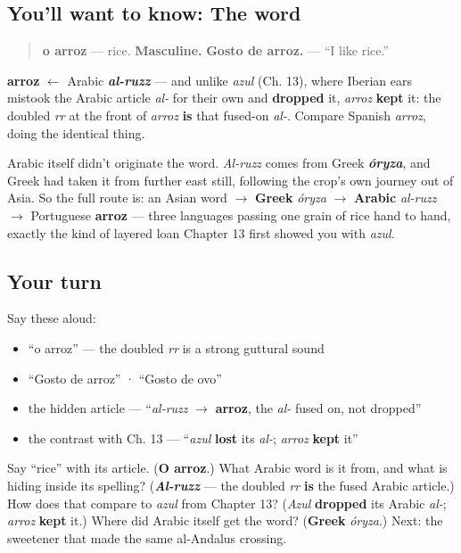 \subsection*{You'll want to know: The word}
\begin{quote}
\textbf{o arroz} — rice. \textbf{Masculine.} \textbf{Gosto de arroz.} — \textquotedblleft{}I like rice.\textquotedblright{}
\end{quote}

\begin{cousinweb}
\textbf{arroz} $\leftarrow$ Arabic \emph{\textbf{al-ruzz}} — and unlike \emph{azul} (Ch. 13), where Iberian ears mistook the Arabic article \emph{al-} for their own and \textbf{dropped} it, \emph{arroz} \textbf{kept} it: the doubled \emph{rr} at the front of \emph{arroz} \textbf{is} that fused-on \emph{al-}. Compare Spanish \emph{arroz}, doing the identical thing.

Arabic itself didn't originate the word. \emph{Al-ruzz} comes from Greek \emph{\textbf{óryza}}, and Greek had taken it from further east still, following the crop's own journey out of Asia. So the full route is: an Asian word $\to$ \textbf{Greek} \emph{óryza} $\to$ \textbf{Arabic} \emph{al-ruzz} $\to$ Portuguese \textbf{arroz} — three languages passing one grain of rice hand to hand, exactly the kind of layered loan Chapter 13 first showed you with \emph{azul}.
\end{cousinweb}

\subsection*{Your turn}
Say these aloud:

\begin{itemize}
\raggedright
  \item \textquotedblleft{}o arroz\textquotedblright{} — the doubled \emph{rr} is a strong guttural sound
  \item \textquotedblleft{}Gosto de arroz\textquotedblright{} · \textquotedblleft{}Gosto de ovo\textquotedblright{}
  \item the hidden article — \textquotedblleft{}\emph{al-ruzz} $\to$ \textbf{arroz}, the \emph{al-} fused on, not dropped\textquotedblright{}
  \item the contrast with Ch. 13 — \textquotedblleft{}\emph{azul} \textbf{lost} its \emph{al-}; \emph{arroz} \textbf{kept} it\textquotedblright{}
\end{itemize}

\begin{tcolorbox}[breakable,colback=teal!4,colframe=teal!35!black,title={Before you move on}]
Say \textquotedblleft{}rice\textquotedblright{} with its article. (\textbf{O arroz}.) What Arabic word is it from, and what is hiding inside its spelling? (\emph{\textbf{Al-ruzz}} — the doubled \emph{rr} \textbf{is} the fused Arabic article.) How does that compare to \emph{azul} from Chapter 13? (\emph{Azul} \textbf{dropped} its Arabic \emph{al-}; \emph{arroz} \textbf{kept} it.) Where did Arabic itself get the word? (\textbf{Greek} \emph{óryza}.) Next: the sweetener that made the same al-Andalus crossing.
\end{tcolorbox}
